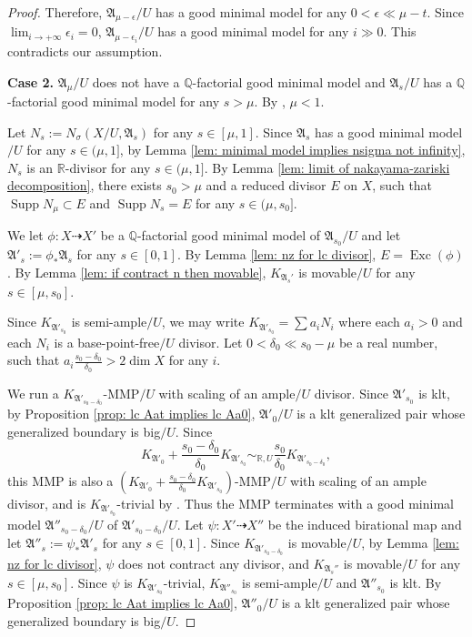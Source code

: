 \documentclass[12pt]{amsart}
\numberwithin{equation}{section}
\newcommand{\Rr}{\mathbb{R}}
\newcommand{\Exc}{\operatorname{Exc}}
\newcommand{\Supp}{\operatorname{Supp}}
\newcommand{\Aa}{{\mathfrak{A}}}
\theoremstyle{definition}
\theoremstyle{definition}
\theoremstyle{definition}
\begin{document}
\begin{proof}
Therefore, $\Aa_{\mu-\epsilon}/U$ has a good minimal model for any $0<\epsilon\ll\mu-t$. Since $\lim_{i\rightarrow+\infty}\epsilon_i=0$, $\Aa_{\mu-\epsilon_i}/U$ has a good minimal model for any $i\gg 0$. This contradicts our assumption.

\medskip

\noindent\textbf{Case 2.} $\Aa_{\mu}/U$ does not have a $\mathbb Q$-factorial good minimal model and $\Aa_s/U$ has a $\mathbb Q$-factorial good minimal model for any $s>\mu$. By \cite[Theorem 1.5]{LMX24}, $\mu<1$. 

Let $N_s:=N_{\sigma}(X/U,\Aa_s)$ for any $s\in [\mu,1]$. Since $\Aa_{s}$ has a good minimal model$/U$ for any $s\in (\mu,1]$, by Lemma \ref{lem: minimal model implies nsigma not infinity}, $N_s$ is an $\Rr$-divisor for any $s\in (\mu,1]$. By Lemma \ref{lem: limit of nakayama-zariski decomposition}, there exists $s_0>\mu$ and a reduced divisor $E$ on $X$, such that $\Supp N_\mu\subset E$ and $\Supp N_s=E$ for any $s\in (\mu,s_0]$.

We let $\phi: X\dashrightarrow X'$ be a $\mathbb Q$-factorial good minimal model of $\Aa_{s_0}/U$ and let $\Aa'_s:=\phi_*\Aa_s$ for any $s\in [0,1]$. By Lemma \ref{lem: nz for lc divisor}, $E=\Exc(\phi)$. By Lemma \ref{lem: if contract n then movable}, $K_{\Aa_s'}$ is movable$/U$ for any $s\in [\mu,s_0]$. 


Since $K_{\Aa'_{s_0}}$ is semi-ample$/U$, we may write $K_{\Aa'_{s_0}}=\sum a_iN_i$ where each $a_i>0$ and each $N_i$ is a base-point-free$/U$ divisor. Let $0<\delta_0\ll s_0-\mu$ be a real number, such that $a_i\frac{s_0-\delta_0}{\delta_0}>2\dim X$ for any $i$.

We run a $K_{\Aa'_{s_0-\delta_0}}$-MMP$/U$ with scaling of an ample$/U$ divisor. Since $\Aa'_{s_0}$ is klt, by Proposition \ref{prop: lc Aat implies lc Aa0}, $\Aa'_0/U$ is a klt generalized pair whose generalized boundary is big$/U$. Since
$$K_{\Aa'_0}+\frac{s_0-\delta_0}{\delta_0}K_{\Aa'_{s_0}}\sim_{\mathbb R,U}\frac{s_0}{\delta_0}K_{\Aa'_{s_0-\delta_0}},$$
this MMP is also a $(K_{\Aa'_0}+\frac{s_0-\delta_0}{\delta_0}K_{\Aa'_{s_0}})$-MMP$/U$ with scaling of an ample divisor, and is $K_{\Aa'_{s_0}}$-trivial by \cite[Lemma 4.4(3)]{BZ16}.  Thus the MMP terminates with a good minimal model $\Aa''_{s_0-\delta_0}/U$ of $\Aa'_{s_0-\delta_0}/U$. Let $\psi: X'\dashrightarrow X''$ be the induced birational map and let $\Aa''_s:=\psi_*\Aa'_s$ for any $s\in [0,1]$. Since $K_{\Aa'_{s_0-\delta_0}}$ is movable$/U$, by Lemma \ref{lem: nz for lc divisor}, $\psi$ does not contract any divisor, and $K_{\Aa_s''}$
is movable$/U$ for any $s\in [\mu,s_0]$. Since $\psi$ is $K_{\Aa'_{s_0}}$-trivial, $K_{\Aa''_{s_0}}$ is semi-ample$/U$ and $\Aa''_{s_0}$ is klt. By Proposition \ref{prop: lc Aat implies lc Aa0}, $\Aa''_{0}/U$ is a klt generalized pair whose generalized boundary is big$/U$.


\end{proof}
\end{document}
